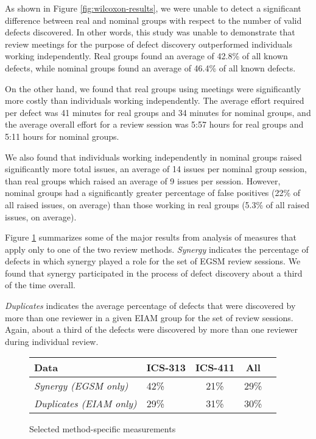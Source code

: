 As shown in Figure \ref{fig:wilcoxon-results}, we were unable to detect a
significant difference between real and nominal groups with respect to the
number of valid defects discovered. In other words, this study was unable
to demonstrate that review meetings for the purpose of defect discovery
outperformed individuals working independently.  Real groups found an
average of 42.8\% of all known defects, while nominal groups found an
average of 46.4\% of all known defects.

On the other hand, we found that real groups using meetings were
significantly more costly than individuals working independently.  The
average effort required per defect was 41 minutes for real groups and 34
minutes for nominal groups, and the average overall effort for a review
session was 5:57 hours for real groups and 5:11 hours for nominal groups.

We also found that individuals working independently in nominal groups
raised significantly more total issues, an average of 14 issues per nominal
group session, than real groups which raised an average of 9 issues per
session.  However, nominal groups had a significantly greater percentage of
false positives (22\% of all raised issues, on average) than those working
in real groups (5.3\% of all raised issues, on average). 

Figure \ref{fig:individual-results} summarizes some of the major results from
analysis of measures that apply only to one of the two review methods.
{\em Synergy} indicates the percentage of defects in which
synergy played a role for the set of EGSM review sessions. We found that
synergy participated in the process of defect discovery about a third
of the time overall. 

{\em Duplicates} indicates the average percentage of defects that were
discovered by more than one reviewer in a given EIAM group for the set of
review sessions. Again, about a third of the defects were discovered by 
more than one reviewer during individual review. 

\begin{figure}[ht]
\small
  \begin{center}
  \begin{tabular}{|l|l|c|c|c|}
   \hline
Data                       & ICS-313 & ICS-411 & All \\
   \hline
{\em Synergy (EGSM only)}         & 42\%    & 21\%     & 29\% \\
{\em Duplicates (EIAM only)}      & 29\%    & 31\%     & 30\% \\
  \hline
   \end{tabular}
  \end{center}
 \caption{Selected method-specific measurements}
 \label{fig:individual-results}
\normalsize
\end{figure}

